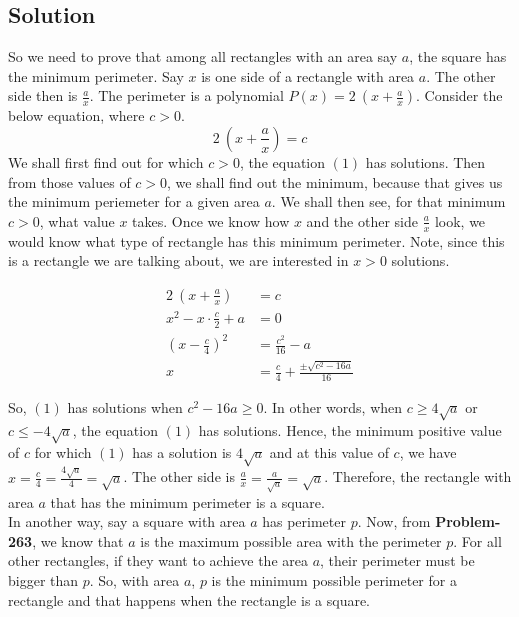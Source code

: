 \documentclass[12pt]{article}
\begin{document}
\subsection*{Solution}
So we need to prove that among all rectangles with an area say $a$, the square has the minimum perimeter. Say $x$ is one side of a rectangle with area $a$. The other side then is $\frac{a}{x}$. The perimeter is a polynomial $P(x) = 2\ \left( x + \frac{a}{x} \right)$. Consider the below equation, where $c > 0$.
\setcounter{equation}{0}
\begin{equation}
	2\ \left( x + \frac{a}{x} \right) = c
\end{equation}
We shall first find out for which $c > 0$, the equation $(1)$ has solutions. Then from those values of $c > 0$, we shall find out the minimum, because that gives us the minimum periemeter for a given area $a$. We shall then see, for that minimum $c > 0$, what value $x$ takes. Once we know how $x$ and the other side $\frac{a}{x}$ look, we would know what type of rectangle has this minimum perimeter. Note, since this is a rectangle we are talking about, we are interested in $x > 0$ solutions.

\begin{equation*}
	\begin{aligned}
		2\ \left( x + \frac{a}{x} \right) &= c\\
		x^2 - x\cdot \frac{c}{2} + a &= 0\\
		\left( x - \frac{c}{4} \right)^2 &= \frac{c^2}{16} - a\\
		x &= \frac{c}{4} + \frac{ \pm \sqrt{ c^2 - 16a } }{16}
	\end{aligned}
\end{equation*}

So, $(1)$ has solutions when $c^2-16a \geq 0$. In other words, when $c \geq 4\sqrt{a}$ or $c \leq -4\sqrt{a}$, the equation $(1)$ has solutions. Hence, the minimum positive value of $c$ for which $(1)$ has a solution is $4\sqrt{a}$ and at this value of $c$, we have $x = \frac{c}{4} = \frac{4\sqrt{a}}{4} = \sqrt{a}$. The other side is $\frac{a}{x} = \frac{a}{\sqrt{a}} = \sqrt{a}$. Therefore, the rectangle with area $a$ that has the minimum perimeter is a square.\\

In another way, say a square with area $a$ has perimeter $p$. Now, from \textbf{Problem-263}, we know that $a$ is the maximum possible area with the perimeter $p$. For all other rectangles, if they want to achieve the area $a$, their perimeter must be bigger than $p$. So, with area $a$, $p$ is the minimum possible perimeter for a rectangle and that happens when the rectangle is a square.
\end{document}
